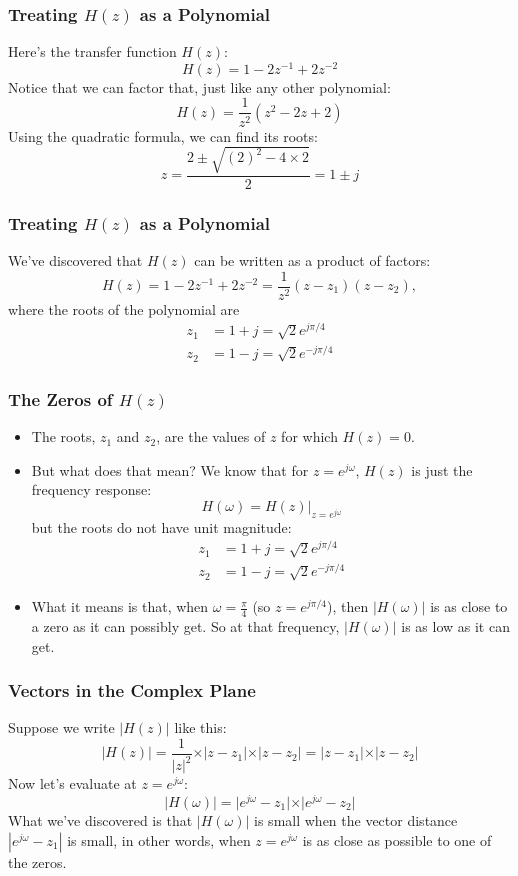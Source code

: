 \documentclass{beamer}
\begin{document}
\begin{frame}
  \frametitle{Treating $H(z)$ as a Polynomial}
  
  Here's the transfer function $H(z)$:
  \[
  H(z) = 1-2z^{-1}+2z^{-2}
  \]
  Notice that we can factor that, just like any other polynomial:
  \[
  H(z) = \frac{1}{z^2}\left(z^2 -2z+2\right)
  \]
  Using the quadratic formula, we can find its roots:
  \[
  z = \frac{2\pm\sqrt{(2)^2-4\times 2}}{2}= 1\pm j
  \]
\end{frame}

\begin{frame}
  \frametitle{Treating $H(z)$ as a Polynomial}
  
  We've discovered that $H(z)$ can be written as a product of factors:
  \[
  H(z) = 1-2z^{-1}+2z^{-2} = \frac{1}{z^2}(z-z_1)(z-z_2),
  \]
  where the roots of the polynomial are
  \begin{align*}
    z_1 &= 1+j =\sqrt{2}e^{j\pi/4}\\
    z_2 &= 1-j = \sqrt{2}e^{-j\pi/4}
  \end{align*}
\end{frame}

\begin{frame}
  \frametitle{The Zeros of $H(z)$}

  \begin{itemize}
  \item The roots, $z_1$ and $z_2$, are the values of $z$ for which
    $H(z)=0$.
  \item But what does that mean?  We know that for $z=e^{j\omega}$,
    $H(z)$ is just the frequency response:
    \[
    H(\omega) = H(z)\vert_{z=e^{j\omega}}
    \]
    but the roots do not have unit magnitude:
    \begin{align*}
      z_1 &= 1+j =\sqrt{2}e^{j\pi/4}\\
      z_2 &= 1-j = \sqrt{2}e^{-j\pi/4}
    \end{align*}
  \item What it means is that, when $\omega=\frac{\pi}{4}$ (so
    $z=e^{j\pi/4}$), then $|H(\omega)|$ is as close to a zero as it
    can possibly get.  So at that frequency, $|H(\omega)|$ is as low
    as it can get.
  \end{itemize}
\end{frame}

\begin{frame}
  \frametitle{Vectors in the Complex Plane}

  Suppose we write $|H(z)|$ like this:
  \[
  \vert H(z)\vert = \frac{1}{|z|^2}\times\vert z-z_1\vert\times\vert z-z_2\vert
  = \vert z-z_1\vert\times\vert z-z_2\vert
  \]
  Now let's evaluate at $z=e^{j\omega}$:
  \[
  \vert H(\omega)\vert = 
  \vert e^{j\omega} -z_1\vert\times\vert e^{j\omega}-z_2\vert
  \]
  What we've discovered is that $|H(\omega)|$ is small when the vector
  distance $|e^{j\omega}-z_1|$ is small, in other words, when
  $z=e^{j\omega}$ is as close as possible to one of the zeros.
\end{frame}
\end{document}
